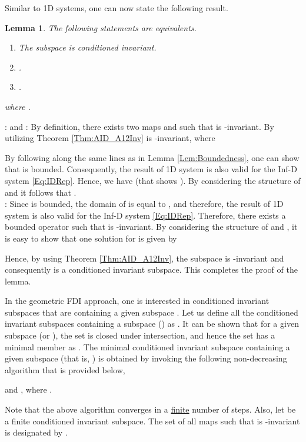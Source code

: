 \documentclass[journal,12pt,draftcls,onecolumn]{IEEEtran}
\def\QEDclosed{\hfill\IEEEQEDclosed}
\renewcommand{\qed}{\QEDclosed}
\renewenvironment{proof}[1][\proofname]{\noindent\nobreakspace{\bfseries #1}:\;}{\qed\par}
\newtheorem{lemma}{Lemma}
\begin{document}
Similar to 1D systems, one can now state the following result.
\begin{lemma}\label{Lem:CA_Inv}
	The following statements are equivalents.
	\begin{enumerate}
		\renewcommand{\labelenumi}{(\roman{enumi})}
		\item The subspace  is conditioned invariant.
		\item  .
		\item .
	\end{enumerate}
	where .
\end{lemma}
\begin{proof}
	 and : By definition, there exists two maps  and  such that  is -invariant. By utilizing Theorem \ref{Thm:AID_A12Inv}  is -invariant, where
	
	By following along the same lines as in Lemma \ref{Lem:Boundedness}, one can show that  is bounded. Consequently, the result of 1D system is also valid for the Inf-D system \eqref{Eq:IDRep}. Hence, we have  (that shows ). By considering the structure of  and  it follows that .\\
	: Since  is bounded, the domain of  is equal to , and therefore, the result of 1D system is also valid for the Inf-D system \eqref{Eq:IDRep}. Therefore, there exists a bounded operator  such that  is -invariant. By considering the structure of  and , it is easy to show that one solution for  is given by
	
	Hence, by using Theorem \ref{Thm:AID_A12Inv}, the subspace  is -invariant and consequently  is a conditioned invariant subspace. This completes the proof of the lemma.
\end{proof}

In the geometric FDI approach, one is interested in conditioned invariant subspaces that are containing a given subspace \cite{Massoumnia1989}. Let us define all the conditioned invariant subspaces containing a subspace  () as  .  It can be shown that for a given subspace  (or ), the set  is closed under intersection, and hence the set  has a minimal member as . The minimal conditioned invariant subspace containing a given subspace  (that is, ) is obtained by invoking the following non-decreasing algorithm that is provided below,

and , where . 

Note that the above algorithm converges in a \underline{finite} number of steps. Also, let  be a finite conditioned invariant subspace.  The set of all maps  such that  is -invariant is designated by .
\end{document}
